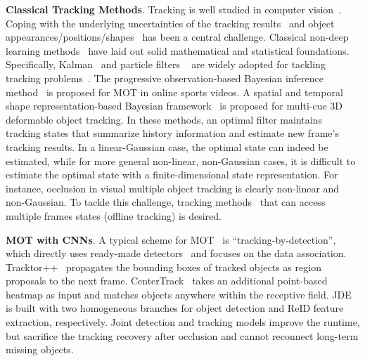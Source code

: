 \noindent \textbf{Classical Tracking Methods}.
Tracking is well studied in computer vision~\cite{isard1998condensation,babenko2010robust,wu2013online,kristan2015visual}.
Coping with the underlying uncertainties of the tracking results~\cite{isard1998condensation} and object appearances/positions/shapes~\cite{babenko2010robust} has been a central challenge.
Classical non-deep learning methods~\cite{wu2013online} have laid out solid mathematical and statistical foundations.
Specifically, Kalman~\cite{welch1995introduction} and particle filters ~\cite{gustafsson2002particle} are widely adopted for tackling tracking problems~\cite{shen2003probabilistic,hue2001particle,xing2009multi}. The progressive observation-based Bayesian inference method~\cite{xing2010multiple} is proposed for MOT in online sports videos. A spatial and temporal shape representation-based Bayesian framework~\cite{giebel2004bayesian} is proposed for multi-cue 3D deformable object tracking. In these methods,
an optimal filter maintains tracking states that summarize history information and estimate new frame's tracking results. In a linear-Gaussian case, the optimal state can indeed be estimated, while for more general non-linear, non-Gaussian cases, it is difficult to estimate the optimal state with a finite-dimensional state representation. For instance, occlusion in visual multiple object tracking is clearly non-linear and non-Gaussian.
To tackle this challenge, tracking methods~\cite{choi2010multiple,perera2006multi} that can access multiple frames states (offline tracking) is desired.

\vspace{2pt} \noindent \textbf{MOT with CNNs}.
A typical scheme for MOT~\cite{wojke2017simple,feng2019multi,wang2019exploit,chu2019famnet} is ``tracking-by-detection'', which directly uses ready-made detectors~\cite{felzenszwalb2009object,ren2015faster,liu2016ssd,zhou2019objects,ge2021yolox} and focuses on the data association.
Tracktor++~\cite{bergmann2019tracking} propagates the bounding boxes of tracked objects as region proposals to the next frame.
CenterTrack~\cite{zhou2020tracking} takes an additional point-based heatmap as input and matches objects anywhere within the receptive field.
JDE~\cite{xu2018joint,wang2019towards,zhang2020fair,li2021semi} is built with two homogeneous branches for object detection and ReID feature extraction, respectively.
Joint detection and tracking models improve the runtime, but sacrifice the tracking recovery after occlusion and cannot reconnect long-term missing objects.

